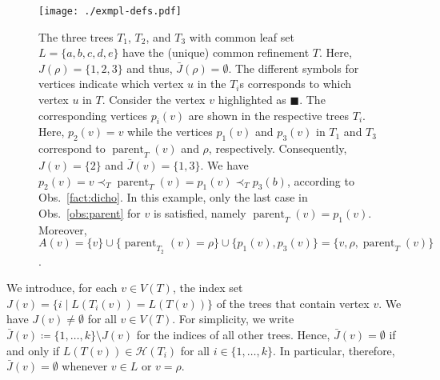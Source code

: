 \documentclass[11pt]{article}
\newcommand{\parent}{\operatorname{parent}}
\newcommand{\HH}{\mathcal{H}}
\begin{document}
\begin{figure}[t]
  \begin{center}
    \texttt{[image: ./exmpl-defs.pdf]}
  \end{center}
  \caption{The three trees $T_1$, $T_2$, and $T_3$ with common leaf set
    $L=\{a,b,c,d,e\}$ have the (unique) common refinement $T$. Here,
    $J(\rho)=\{1,2,3\}$ and thus, $\bar J(\rho) = \emptyset$.  The
    different symbols for vertices indicate which vertex $u$ in the $T_i$s
    corresponds to which vertex $u$ in $T$. Consider the vertex $v$
    highlighted as $\blacksquare$.  The corresponding vertices $p_i(v)$ are
    shown in the respective trees $T_i$.  Here, $p_2(v)=v$ while the
    vertices $p_1(v)$ and $p_3(v)$ in $T_1$ and $T_3$ correspond to
    $\parent_T(v)$ and $\rho$, respectively. Consequently, $J(v) = \{2\}$
    and $\bar J(v)=\{1,3\}$. We have
    $p_2(v)=v\prec_T\parent_T(v) = p_1(v)\prec_T p_3(b)$, according to
    Obs.\ \ref{fact:dicho}. In this example, only the last case in Obs.\
    \ref{obs:parent} for $v$ is satisfied, namely $\parent_T(v)=p_1(v)$.
    Moreover,
    $A(v) = \{v\} \cup \{\parent_{T_2}(v)=\rho\} \cup \{p_1(v),p_3(v)\} =
    \{v,\rho, \parent_T(v)\}$.   }
  \label{fig:exmpl-defs}
\end{figure}

We introduce, for each $v\in V(T)$, the index set
$J(v)=\{i\mid L(T_i(v))=L(T(v))\}$ of the trees that contain vertex $v$. We
have $J(v)\neq \emptyset$ for all $v\in V(T)$. For simplicity, we write
$\bar J(v)\coloneqq \{1,\dots,k\}\setminus J(v)$ for the indices of all
other trees. Hence, $\bar J(v)=\emptyset$ if and only if
$L(T(v))\in \HH(T_i)$ for all $i\in \{1,\dots,k\}$. In particular,
therefore, $\bar J(v)=\emptyset$ whenever $v\in L$ or $v=\rho$.
\end{document}

